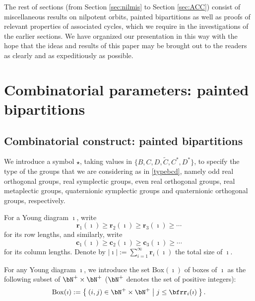 \documentclass[12pt,a4paper]{amsart}
\def\abs#1{\left|{#1}\right|}
\numberwithin{equation}{section}
\theoremstyle{remark}
\def\BOX{\mathrm{Box}}
\begin{document}
The rest of sections (from Section \ref{sec:nilmis} to Section \ref{sec:ACC}) consist of miscellaneous results on nilpotent orbits, painted bipartitions as well as proofs of relevant properties of associated cycles, which we require in the investigations of the earlier sections. We have organized our presentation in this way with the hope that the ideas and results of this paper may be brought out to the readers as clearly and as expeditiously as possible.


\section{Combinatorial parameters: painted bipartitions}\label{sec:bip}
\subsection{Combinatorial construct: painted bipartitions}

We introduce a symbol $\star$, taking values in $\{B,C,D,\widetilde {C}, C^*, D^*\}$, to specify the type of the groups that we are considering as in \eqref{typebcd}, namely odd real orthogonal groups, real symplectic groups, even real orthogonal groups, real metaplectic groups, quaternionic symplectic groups and quaternionic orthogonal groups, respectively.

For a Young diagram $\imath$, write
\[
 \mathbf r_1(\imath)\geq \mathbf r_2(\imath)\geq \mathbf r_3(\imath)\geq \cdots
\]
for its row lengths, and similarly,
write
\[
 \mathbf c_1(\imath)\geq \mathbf c_2(\imath)\geq \mathbf c_3(\imath)\geq \cdots
\]
for its column lengths.
Denote by $\abs{\imath}:=\sum_{i=1}^\infty \mathbf r_i(\imath)$ the total size of $\imath$.



For any Young diagram $\imath$, we introduce the set $\BOX(\imath)$ of boxes of $\imath$ as the following subset
of $\bN^+\times \bN^+$ ($\bN^+$ denotes the set of positive integers):
\begin{equation}\label{eq:BOX}
\BOX(\imath):=\Set{(i,j)\in\bN^+\times \bN^+| j\leq \bfrr_i(\imath)}.
\end{equation}

\end{document}
